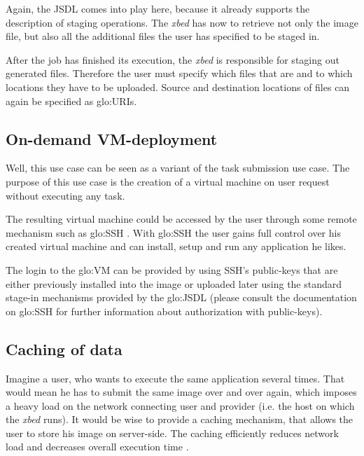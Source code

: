 Again,  the JSDL comes  into play  here, because  it already  supports the
description of staging operations. The \emph{xbed} has now to retrieve not
only  the image  file, but  also  all the  additional files  the user  has
specified to be staged in.

After the job  has finished its execution, the  \emph{xbed} is responsible
for staging  out generated  files. Therefore the  user must  specify which
files that are and to which locations they have to be uploaded. Source and
destination locations of files can again be specified as \gls{glo:URI}s.

\subsection{On-demand VM-deployment}
\label{sec:uc-on-demand-vm-deployment}

Well, this use  case can be seen  as a variant of the  task submission use
case. The purpose of this use case is the creation of a virtual machine on
user request without executing any task.

The resulting virtual  machine could be accessed by  the user through some
remote mechanism such as \gls{glo:SSH} \cite{openssh}.  With \gls{glo:SSH}
the  user gains  full control  over his  created virtual  machine  and can
install, setup and run any application he likes.

The login to  the \gls{glo:VM} can be provided  by using SSH's public-keys
that  are either  previously installed  into the  image or  uploaded later
using  the standard  stage-in  mechanisms provided  by the  \gls{glo:JSDL}
(please consult the documentation on \gls{glo:SSH} for further information
about authorization with public-keys).


\subsection{Caching of data}
\label{sec:uc-data-caching}

Imagine a user,  who wants to execute the  same application several times.
That would mean he has to submit the same image over and over again, which
imposes a heavy load on the network connecting user and provider (i.e. the
host on which the \emph{xbed} runs). It would be wise to provide a caching
mechanism, that  allows the  user to store  his image on  server-side. The
caching efficiently  reduces network load and  decreases overall execution
time \cite{locality-principle}.


